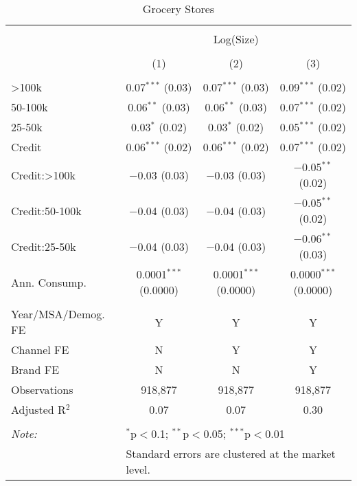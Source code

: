 
\begin{table}[!htbp] \centering 
  \caption{Grocery Stores} 
  \label{tab:packageSizeGrocerySoda} 
\begin{tabular}{@{\extracolsep{5pt}}lccc} 
\\[-1.8ex]\hline 
\hline \\[-1.8ex] 
 & \multicolumn{3}{c}{Log(Size)} \\ 
\\[-1.8ex] & (1) & (2) & (3)\\ 
\hline \\[-1.8ex] 
 >100k & 0.07$^{***}$ (0.03) & 0.07$^{***}$ (0.03) & 0.09$^{***}$ (0.02) \\ 
  50-100k & 0.06$^{**}$ (0.03) & 0.06$^{**}$ (0.03) & 0.07$^{***}$ (0.02) \\ 
  25-50k & 0.03$^{*}$ (0.02) & 0.03$^{*}$ (0.02) & 0.05$^{***}$ (0.02) \\ 
  Credit & 0.06$^{***}$ (0.02) & 0.06$^{***}$ (0.02) & 0.07$^{***}$ (0.02) \\ 
  Credit:>100k & $-$0.03 (0.03) & $-$0.03 (0.03) & $-$0.05$^{**}$ (0.02) \\ 
  Credit:50-100k & $-$0.04 (0.03) & $-$0.04 (0.03) & $-$0.05$^{**}$ (0.02) \\ 
  Credit:25-50k & $-$0.04 (0.03) & $-$0.04 (0.03) & $-$0.06$^{**}$ (0.03) \\ 
  Ann. Consump. & 0.0001$^{***}$ (0.0000) & 0.0001$^{***}$ (0.0000) & 0.0000$^{***}$ (0.0000) \\ 
 \hline \\[-1.8ex] 
Year/MSA/Demog. FE & Y & Y & Y \\ 
Channel FE & N & Y & Y \\ 
Brand FE & N & N & Y \\ 
Observations & 918,877 & 918,877 & 918,877 \\ 
Adjusted R$^{2}$ & 0.07 & 0.07 & 0.30 \\ 
\hline 
\hline \\[-1.8ex] 
\textit{Note:}  & \multicolumn{3}{l}{$^{*}$p$<$0.1; $^{**}$p$<$0.05; $^{***}$p$<$0.01} \\ 
 & \multicolumn{3}{l}{Standard errors are clustered at the market level.} \\ 
\end{tabular} 
\end{table} 
